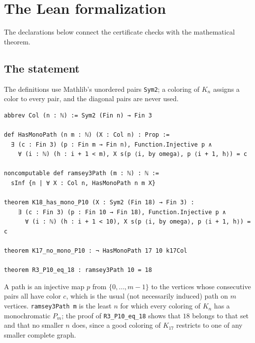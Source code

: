 \section{The Lean formalization}\label{sec:lean}
The declarations below connect the certificate checks with the mathematical theorem.

\subsection{The statement}
The definitions use Mathlib's unordered pairs \texttt{Sym2}; a coloring of
$K_n$ assigns a color to every pair, and the diagonal pairs are never
used.
\begin{Verbatim}
abbrev Col (n : ℕ) := Sym2 (Fin n) → Fin 3

def HasMonoPath (n m : ℕ) (X : Col n) : Prop :=
  ∃ (c : Fin 3) (p : Fin m → Fin n), Function.Injective p ∧
    ∀ (i : ℕ) (h : i + 1 < m), X s(p ⟨i, by omega⟩, p ⟨i + 1, h⟩) = c

noncomputable def ramsey3Path (m : ℕ) : ℕ :=
  sInf {n | ∀ X : Col n, HasMonoPath n m X}

theorem K18_has_mono_P10 (X : Sym2 (Fin 18) → Fin 3) :
    ∃ (c : Fin 3) (p : Fin 10 → Fin 18), Function.Injective p ∧
      ∀ (i : ℕ) (h : i + 1 < 10), X s(p ⟨i, by omega⟩, p ⟨i + 1, h⟩) = c

theorem K17_no_mono_P10 : ¬ HasMonoPath 17 10 k17Col

theorem R3_P10_eq_18 : ramsey3Path 10 = 18
\end{Verbatim}
A path is an injective map $p$ from $\{0,\dots,m-1\}$ to the vertices whose
consecutive pairs all have color $c$, which is the usual (not necessarily
induced) path on $m$ vertices. \texttt{ramsey3Path m} is the least $n$ for
which every coloring of $K_n$ has a monochromatic $P_m$; the proof of
\texttt{R3\_P10\_eq\_18} shows that $18$ belongs to that set and that no
smaller $n$ does, since a good coloring of $K_{17}$ restricts to one of any
smaller complete graph.

